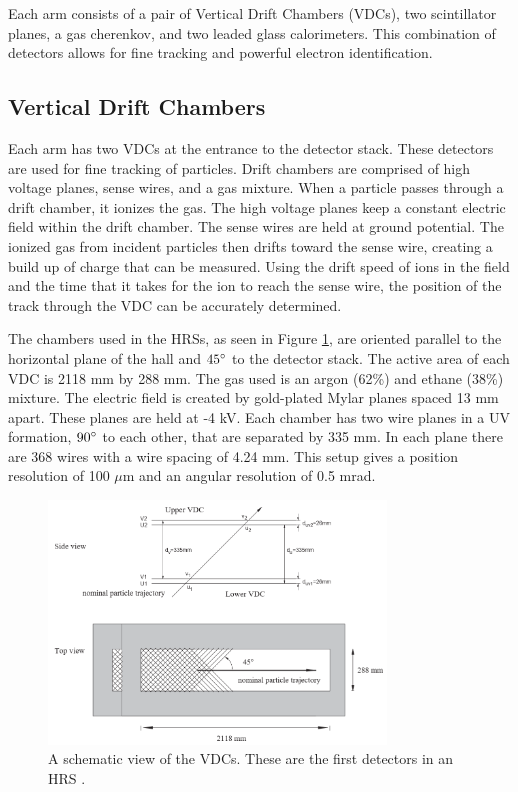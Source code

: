 Each arm consists of a pair of Vertical Drift Chambers (VDCs), two scintillator planes, a gas cherenkov, and two leaded glass calorimeters. This combination of detectors allows for fine tracking and powerful electron identification.

\subsection{Vertical Drift Chambers}

Each arm has two VDCs at the entrance to the detector stack. These detectors are used for fine tracking of particles. Drift chambers are comprised of high voltage planes, sense wires, and a gas mixture. When a particle passes through a drift chamber, it ionizes the gas. The high voltage planes keep a constant electric field within the drift chamber. The sense wires are held at ground potential. The ionized gas from incident particles then drifts toward the sense wire, creating a build up of charge that can be measured. Using the drift speed of ions in the field and the time that it takes for the ion to reach the sense wire, the position of the track through the VDC can be accurately determined.

The chambers used in the HRSs, as seen in Figure \ref{fig:vdcs}, are oriented parallel to the horizontal plane of the hall and $45\degree$ to the detector stack. The active area of each VDC is 2118 mm by 288 mm. The gas used is an argon (62\%) and ethane (38\%) mixture. The electric field is created by gold-plated Mylar planes spaced 13 mm apart. These planes are held at -4 kV. Each chamber has two wire planes in a UV formation, $90\degree$ to each other, that are separated by 335 mm. In each plane there are 368 wires with a wire spacing of 4.24 mm. This setup gives a position resolution of 100 $\mu$m and an angular resolution of 0.5 mrad.

\begin{figure}
\begin{center}
	\includegraphics[width=0.8\textwidth]{./setup/fig/vdc.png}
	\caption{A schematic view of the VDCs. These are the first detectors in an HRS \cite{HANIM}.}
	\label{fig:vdcs}
\end{center}
\end{figure}

